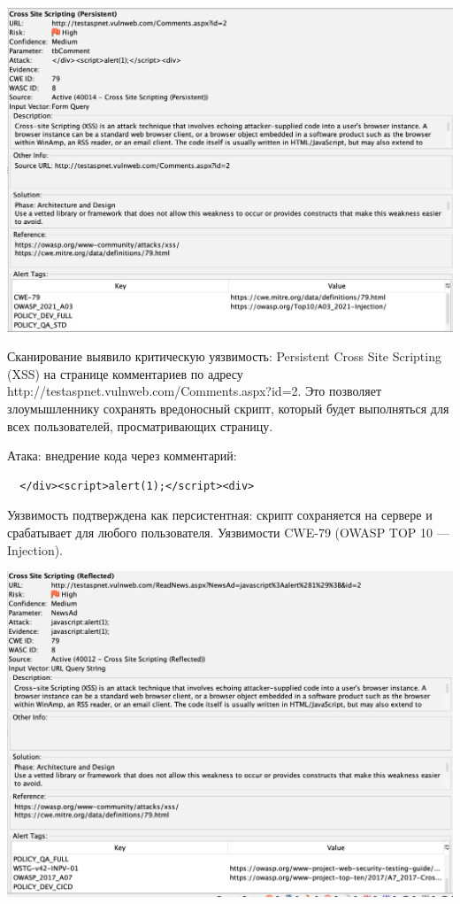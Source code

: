 \documentclass{article}
\begin{document}
\begin{center}
  \includegraphics[width=.9\textwidth]{1}
\end{center}

Сканирование выявило критическую уязвимость: Persistent Cross Site Scripting (XSS) на странице комментариев по адресу http://testaspnet.vulnweb.com/Comments.aspx?id=2. Это позволяет злоумышленнику сохранять вредоносный скрипт, который будет выполняться для всех пользователей, просматривающих страницу.

Атака: внедрение кода через комментарий:
\begin{lstlisting}
  </div><script>alert(1);</script><div>
\end{lstlisting}

Уязвимость подтверждена как персистентная: скрипт сохраняется на сервере и срабатывает для любого пользователя. Уязвимости CWE-79 (OWASP TOP 10 — Injection).


\begin{center}
  \includegraphics[width=.9\textwidth]{1-1}
\end{center}
\end{document}
